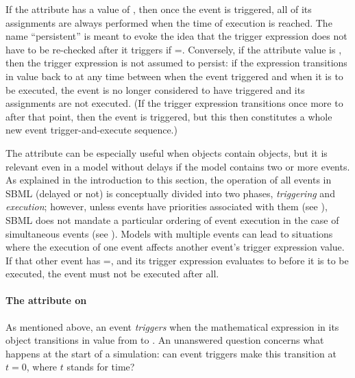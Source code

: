 If the  attribute  has a value of
, then once the event is triggered, all of its assignments
are always performed when the time of execution is reached.  The
name ``persistent'' is meant to evoke the idea that the trigger
expression does not have to be re-checked after it triggers if
=.  Conversely, if the attribute value
is , then the trigger expression is not assumed to
persist: if the expression transitions in value back to
 at any time between when the event triggered and when it
is to be executed, the event is no longer considered to have triggered
and its assignments are not executed.  (If the trigger expression
transitions once more to  after that point, then the
event is triggered, but this then constitutes a whole new event
trigger-and-execute sequence.)

The  attribute can be especially useful when
\Event objects contain \Delay objects, but it is relevant even in
a model without delays if the model contains two or more events.
As explained in the introduction to this section, the operation of
all events in SBML (delayed or not) is conceptually divided into
two phases, \emph{triggering} and \emph{execution}; however, unless
events have priorities associated with them (see
), SBML does not mandate a
particular ordering of event execution in the case of simultaneous
events (see ).  Models with
multiple events can lead to situations where the execution of one
event affects another event's trigger expression value.  If that
other event has =, and its trigger
expression evaluates to  before it is to be executed,
the event must not be executed after all.


\paragraph{The  attribute on \Trigger}
\label{sec:trigger-initialvalue}

As mentioned above, an event \emph{triggers} when the mathematical
expression in its \Trigger object transitions in value from
 to .  An unanswered question concerns what
happens at the start of a simulation: can event triggers make this
transition at $t = 0$, where $t$ stands for time?

